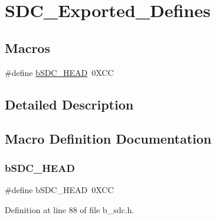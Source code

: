 \hypertarget{group___s_d_c___exported___defines}{}\section{S\+D\+C\+\_\+\+Exported\+\_\+\+Defines}
\label{group___s_d_c___exported___defines}
\subsection*{Macros}
\begin{DoxyCompactItemize}
\item 
\#define \mbox{\hyperlink{group___s_d_c___exported___defines_gac12486eb190a47a4bec21b0af828b3f9}{b\+S\+D\+C\+\_\+\+H\+E\+AD}}~0\+X\+CC
\end{DoxyCompactItemize}


\subsection{Detailed Description}


\subsection{Macro Definition Documentation}
\mbox{\label{group___s_d_c___exported___defines_gac12486eb190a47a4bec21b0af828b3f9}} 
\subsubsection{\texorpdfstring{b\+S\+D\+C\+\_\+\+H\+E\+AD}{bSDC\_HEAD}}
{\footnotesize\ttfamily \#define b\+S\+D\+C\+\_\+\+H\+E\+AD~0\+X\+CC}



Definition at line 88 of file b\+\_\+sdc.\+h.

